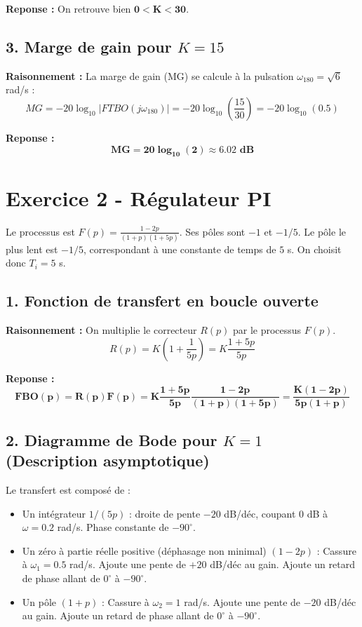 \documentclass[11pt,a4paper]{article}
\begin{document}
\textbf{Reponse :} On retrouve bien $\mathbf{0 < K < 30}$.

\subsection*{3. Marge de gain pour $K=15$}

\textbf{Raisonnement :} La marge de gain (MG) se calcule à la pulsation $\omega_{180} = \sqrt{6}$ rad/s :
$$ MG = -20 \log_{10} |FTBO(j\omega_{180})| = -20 \log_{10} \left( \frac{15}{30} \right) = -20 \log_{10}(0.5) $$

\textbf{Reponse :} 
$$ \mathbf{MG = 20 \log_{10}(2) \approx 6.02 \text{ dB}} $$

\hrulefill

\section*{Exercice 2 - Régulateur PI}

Le processus est $F(p) = \frac{1-2p}{(1+p)(1+5p)}$. Ses pôles sont $-1$ et $-1/5$. Le pôle le plus lent est $-1/5$, correspondant à une constante de temps de $5$ s. On choisit donc $T_i = 5$ s.

\subsection*{1. Fonction de transfert en boucle ouverte}

\textbf{Raisonnement :} On multiplie le correcteur $R(p)$ par le processus $F(p)$.
$$ R(p) = K \left( 1 + \frac{1}{5p} \right) = K \frac{1+5p}{5p} $$

\textbf{Reponse :} 
$$ \mathbf{FBO(p) = R(p)F(p) = K \frac{1+5p}{5p} \frac{1-2p}{(1+p)(1+5p)} = \frac{K(1-2p)}{5p(1+p)}} $$

\subsection*{2. Diagramme de Bode pour $K=1$ (Description asymptotique)}

Le transfert est composé de :
\begin{itemize}
    \item Un intégrateur $1/(5p)$ : droite de pente $-20$ dB/déc, coupant 0 dB à $\omega = 0.2$ rad/s. Phase constante de $-90^\circ$.
    \item Un zéro à partie réelle positive (déphasage non minimal) $(1-2p)$ : Cassure à $\omega_1 = 0.5$ rad/s. Ajoute une pente de $+20$ dB/déc au gain. Ajoute un retard de phase allant de $0^\circ$ à $-90^\circ$.
    \item Un pôle $(1+p)$ : Cassure à $\omega_2 = 1$ rad/s. Ajoute une pente de $-20$ dB/déc au gain. Ajoute un retard de phase allant de $0^\circ$ à $-90^\circ$.
\end{itemize}
\end{document}

